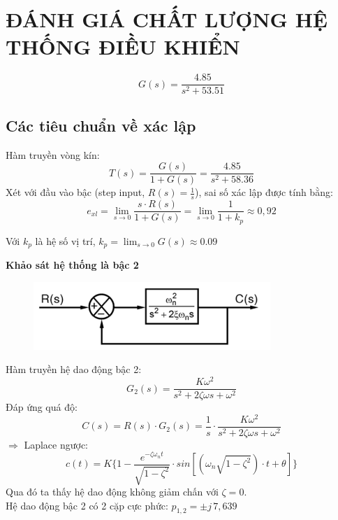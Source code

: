 \chapter{ĐÁNH GIÁ CHẤT LƯỢNG HỆ THỐNG ĐIỀU KHIỂN}
\[
    G(s) = \frac{4.85}{s^2 + 53.51}
\]
\section{Các tiêu chuẩn về xác lập}
Hàm truyền vòng kín:
\[
    T(s) = \frac{G(s)}{1+G(s)} = \frac{4.85}{s^2 + 58.36}
\]
Xét với đầu vào bậc (step input, $R(s)=\frac{1}{s}$), sai số xác lập được tính bằng:
\[
e_{xl} = \lim_{s \to 0} \frac{s \cdot R(s)}{1 + G(s)} 
= \lim_{s \to 0} \frac{1}{1 + k_p} \approx 0{,}92
\]
\begin{center}
    Với $k_p$  là hệ số vị trí, $k_p = \lim_{s \to 0} G(s) \approx 0.09$ 
\end{center}
\textbf{Khảo sát hệ thống là bậc 2}
\begin{figure}[H]
    \centering
    \includegraphics[width=0.8\textwidth]{pictures/closeloop.png}
\end{figure}

Hàm truyền hệ dao động bậc 2:
\[
    G_2(s) = \frac{K\omega^2}{s^2+2\zeta \omega s + \omega^2}
\]
Đáp ứng quá độ:
\[
    C(s) = R(s)\cdot G_2(s) = \frac{1}{s}\cdot \frac{K\omega^2}{s^2+2\zeta \omega s + \omega^2}
\]
$\Rightarrow$ Laplace ngược: 
\[
    c(t) = K\{1-\frac{e^{-\zeta \omega_n t}}{\sqrt{1-\zeta^2}}\cdot sin[(\omega_n\sqrt{1-\zeta^2})\cdot t+\theta] \}
\]
Qua đó ta thấy hệ dao động không giảm chấn với $\zeta = 0$.\\
Hệ dao động bậc 2 có 2 cặp cực phức: $p_{1,2} = \pm j\,7{,}639$ \\

